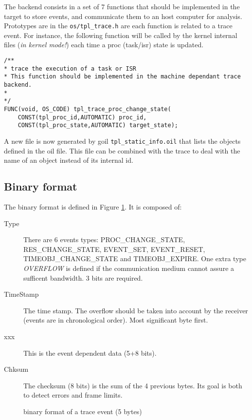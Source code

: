 The backend consists in a set of 7 functions that should be implemented in the target to store events, and communicate them to an host computer for analysis. Prototypes are in the \texttt{os/tpl_trace.h} are each function is related to a trace event. For instance, the following function will be called by the kernel internal files (\emph{in kernel mode!}) each time a proc (task/isr) state is updated.

\begin{lstlisting}
/**
* trace the execution of a task or ISR
* This function should be implemented in the machine dependant trace backend.
*
*/
FUNC(void, OS_CODE) tpl_trace_proc_change_state(
    CONST(tpl_proc_id,AUTOMATIC) proc_id,
    CONST(tpl_proc_state,AUTOMATIC) target_state);
\end{lstlisting}

A new file is now generated by goil \texttt{tpl_static_info.oil} that lists the objects defined in the oil file. This file can be combined with the trace to deal with the name of an object instead of its internal id.


\subsection{Binary format}
\label{sec:traceBinFormat}

The binary format is defined in Figure \ref{fig:traceBin}. It is composed of:
\begin{description}
	\item[Type] There are 6 events types: PROC\_CHANGE\_STATE, RES\_CHANGE\_STATE, EVENT\_SET, EVENT\_RESET, TIMEOBJ\_CHANGE\_STATE and TIMEOBJ\_EXPIRE. One extra type \emph{OVERFLOW} is defined if the communication medium cannot assure a sufficent bandwidth. 3 bits are required.
	\item[TimeStamp] The time stamp. The overflow should be taken into account by the receiver (events are in chronological order). Most significant byte first.
	\item[xxx] This is the event dependent data (5+8 bits).
	\item[Chksum] The checksum (8 bits) is the sum of the 4 previous bytes. Its goal is both to detect errors and frame limits.
\end{description}

\begin{figure}[htbp]
    \centering
	\begin{adjustbox}{width=.8\linewidth,keepaspectratio}
		
	\end{adjustbox}
	\caption{binary format of a trace event (5 bytes)}
	\label{fig:traceBin}
\end{figure}

